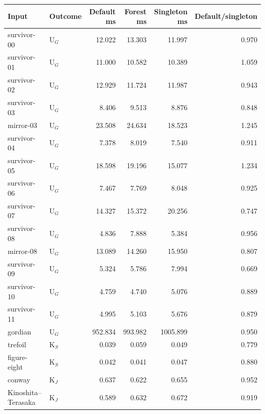 \begingroup
\small\setlength{\tabcolsep}{4pt}
\begin{tabular}{llrrrr}
\toprule
Input & Outcome & Default ms & Forest ms & Singleton ms & Default/singleton \\
\midrule
survivor-00 & $\mathrm{U}_{G}$ & 12.022 & 13.303 & 11.997 & 0.970 \\
survivor-01 & $\mathrm{U}_{G}$ & 11.000 & 10.582 & 10.389 & 1.059 \\
survivor-02 & $\mathrm{U}_{G}$ & 12.929 & 11.724 & 11.987 & 0.943 \\
survivor-03 & $\mathrm{U}_{G}$ & 8.406 & 9.513 & 8.876 & 0.848 \\
mirror-03 & $\mathrm{U}_{G}$ & 23.508 & 24.634 & 18.523 & 1.245 \\
survivor-04 & $\mathrm{U}_{G}$ & 7.378 & 8.019 & 7.540 & 0.911 \\
survivor-05 & $\mathrm{U}_{G}$ & 18.598 & 19.196 & 15.077 & 1.234 \\
survivor-06 & $\mathrm{U}_{G}$ & 7.467 & 7.769 & 8.048 & 0.925 \\
survivor-07 & $\mathrm{U}_{G}$ & 14.327 & 15.372 & 20.256 & 0.747 \\
survivor-08 & $\mathrm{U}_{G}$ & 4.836 & 7.888 & 5.384 & 0.956 \\
mirror-08 & $\mathrm{U}_{G}$ & 13.089 & 14.260 & 15.950 & 0.807 \\
survivor-09 & $\mathrm{U}_{G}$ & 5.324 & 5.786 & 7.994 & 0.669 \\
survivor-10 & $\mathrm{U}_{G}$ & 4.759 & 4.740 & 5.076 & 0.889 \\
survivor-11 & $\mathrm{U}_{G}$ & 4.995 & 5.103 & 5.676 & 0.879 \\
gordian & $\mathrm{U}_{G}$ & 952.834 & 993.982 & 1005.899 & 0.950 \\
trefoil & $\mathrm{K}_{S}$ & 0.039 & 0.059 & 0.049 & 0.779 \\
figure-eight & $\mathrm{K}_{S}$ & 0.042 & 0.041 & 0.047 & 0.880 \\
conway & $\mathrm{K}_{J}$ & 0.637 & 0.622 & 0.655 & 0.952 \\
Kinoshita--Terasaka & $\mathrm{K}_{J}$ & 0.589 & 0.632 & 0.672 & 0.919 \\
\bottomrule
\end{tabular}
\endgroup
